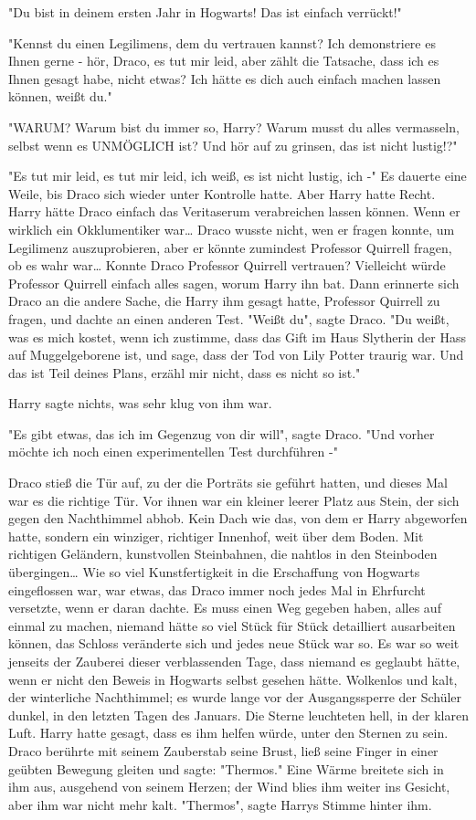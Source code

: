 {"Du bist in deinem ersten Jahr in Hogwarts! Das ist einfach verrückt!"

"Kennst du einen Legilimens, dem du vertrauen kannst? Ich demonstriere es Ihnen gerne - hör, Draco, es tut mir leid, aber zählt die Tatsache, dass ich es Ihnen gesagt habe, nicht etwas? Ich hätte es dich auch einfach machen lassen können, weißt du."

"WARUM? Warum bist du immer so, Harry? Warum musst du alles vermasseln, selbst wenn es UNMÖGLICH ist? Und hör auf zu grinsen, das ist nicht lustig!?"

"Es tut mir leid, es tut mir leid, ich weiß, es ist nicht lustig, ich -" Es dauerte eine Weile, bis Draco sich wieder unter Kontrolle hatte. Aber Harry hatte Recht. Harry hätte Draco einfach das Veritaserum verabreichen lassen können. Wenn er wirklich ein Okklumentiker war… Draco wusste nicht, wen er fragen konnte, um Legilimenz auszuprobieren, aber er könnte zumindest Professor Quirrell fragen, ob es wahr war… Konnte Draco Professor Quirrell vertrauen? Vielleicht würde Professor Quirrell einfach alles sagen, worum Harry ihn bat. Dann erinnerte sich Draco an die andere Sache, die Harry ihm gesagt hatte, Professor Quirrell zu fragen, und dachte an einen anderen Test. "Weißt du", sagte Draco. "Du weißt, was es mich kostet, wenn ich zustimme, dass das Gift im Haus Slytherin der Hass auf Muggelgeborene ist, und sage, dass der Tod von Lily Potter traurig war. Und das ist Teil deines Plans, erzähl mir nicht, dass es nicht so ist."

Harry sagte nichts, was sehr klug von ihm war.

"Es gibt etwas, das ich im Gegenzug von dir will", sagte Draco. "Und vorher möchte ich noch einen experimentellen Test durchführen -"

Draco stieß die Tür auf, zu der die Porträts sie geführt hatten, und dieses Mal war es die richtige Tür. Vor ihnen war ein kleiner leerer Platz aus Stein, der sich gegen den Nachthimmel abhob. Kein Dach wie das, von dem er Harry abgeworfen hatte, sondern ein winziger, richtiger Innenhof, weit über dem Boden. Mit richtigen Geländern, kunstvollen Steinbahnen, die nahtlos in den Steinboden übergingen… Wie so viel Kunstfertigkeit in die Erschaffung von Hogwarts eingeflossen war, war etwas, das Draco immer noch jedes Mal in Ehrfurcht versetzte, wenn er daran dachte. Es muss einen Weg gegeben haben, alles auf einmal zu machen, niemand hätte so viel Stück für Stück detailliert ausarbeiten können, das Schloss veränderte sich und jedes neue Stück war so. Es war so weit jenseits der Zauberei dieser verblassenden Tage, dass niemand es geglaubt hätte, wenn er nicht den Beweis in Hogwarts selbst gesehen hätte. Wolkenlos und kalt, der winterliche Nachthimmel; es wurde lange vor der Ausgangssperre der Schüler dunkel, in den letzten Tagen des Januars. Die Sterne leuchteten hell, in der klaren Luft. Harry hatte gesagt, dass es ihm helfen würde, unter den Sternen zu sein. Draco berührte mit seinem Zauberstab seine Brust, ließ seine Finger in einer geübten Bewegung gleiten und sagte: "Thermos." Eine Wärme breitete sich in ihm aus, ausgehend von seinem Herzen; der Wind blies ihm weiter ins Gesicht, aber ihm war nicht mehr kalt. "Thermos", sagte Harrys Stimme hinter ihm.

}
